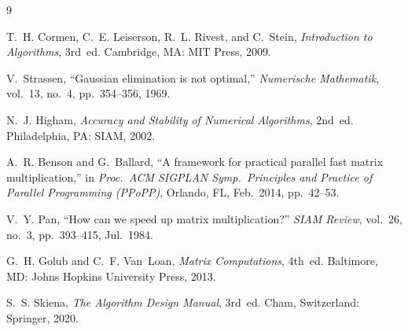 \documentclass[12pt,a4paper]{article}
\begin{document}
\begin{thebibliography}{9}

T.~H. Cormen, C.~E. Leiserson, R.~L. Rivest, and C.~Stein,
\textit{Introduction to Algorithms}, 3rd~ed.
Cambridge, MA: MIT Press, 2009.

V.~Strassen,
``Gaussian elimination is not optimal,''
\textit{Numerische Mathematik}, vol.~13, no.~4, pp.~354--356, 1969.

N.~J. Higham,
\textit{Accuracy and Stability of Numerical Algorithms}, 2nd~ed.
Philadelphia, PA: SIAM, 2002.

A.~R. Benson and G.~Ballard,
``A framework for practical parallel fast matrix multiplication,''
in \textit{Proc.\ ACM SIGPLAN Symp.\ Principles and Practice of Parallel
Programming (PPoPP)}, Orlando, FL, Feb.\ 2014, pp.~42--53.

V.~Y. Pan,
``How can we speed up matrix multiplication?''
\textit{SIAM Review}, vol.~26, no.~3, pp.~393--415, Jul.\ 1984.

G.~H. Golub and C.~F. Van~Loan,
\textit{Matrix Computations}, 4th~ed.
Baltimore, MD: Johns Hopkins University Press, 2013.

S.~S. Skiena,
\textit{The Algorithm Design Manual}, 3rd~ed.
Cham, Switzerland: Springer, 2020.

\end{thebibliography}
\end{document}

